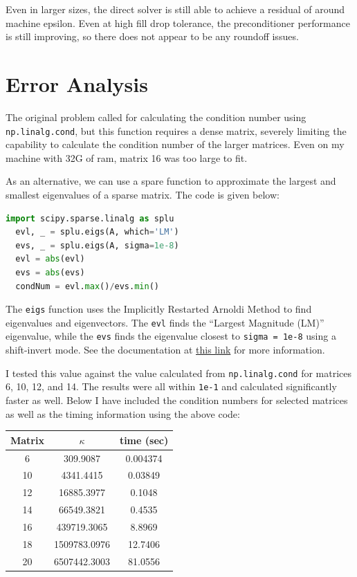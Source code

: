 \documentclass[oneside,final]{amsart}  %
\begin{document}
Even in larger sizes, the direct solver is still able to achieve a residual of around machine epsilon.
Even at high fill drop tolerance, the preconditioner performance is still improving, so there does
not appear to be any roundoff issues.

\section{Error Analysis}
The original problem called for calculating the condition number using \texttt{np.linalg.cond}, but
this function requires a dense matrix, severely limiting the capability to calculate the condition
number of the larger matrices.
Even on my machine with 32G of ram, matrix 16 was too large to fit.

As an alternative, we can use a spare function to approximate the largest and smallest eigenvalues
of a sparse matrix.  The code is given below:
\begin{lstlisting}[language=Python]
  import scipy.sparse.linalg as splu
  evl, _ = splu.eigs(A, which='LM')
  evs, _ = splu.eigs(A, sigma=1e-8)
  evl = abs(evl)
  evs = abs(evs)
  condNum = evl.max()/evs.min()
\end{lstlisting}
The \texttt{eigs} function uses the Implicitly Restarted Arnoldi Method to find eigenvalues and eigenvectors.
The \texttt{evl} finds the ``Largest Magnitude (LM)'' eigenvalue, while the \texttt{evs} finds the
eigenvalue closest to \texttt{sigma = 1e-8} using a shift-invert mode.  See the documentation at
\href{https://docs.scipy.org/doc/scipy/reference/generated/scipy.sparse.linalg.eigs.html}{this link} for more
information.

I tested this value against the value calculated from \texttt{np.linalg.cond} for matrices 6, 10,
12, and 14. The results were all within \texttt{1e-1} and calculated significantly faster as
well. Below I have included the condition numbers for selected matrices as well as the timing
information using the above code:
\begin{center}
\begin{tabular}{|c|c|c|}
  \hline
  Matrix & $\kappa$ & time (sec) \\
  \hline
  6 &      309.9087 & 0.004374 \\
  10 &    4341.4415 & 0.03849 \\
  12 &   16885.3977 & 0.1048 \\
  14 &   66549.3821 & 0.4535 \\
  16 &  439719.3065 & 8.8969 \\
  18 & 1509783.0976 & 12.7406 \\
  20 & 6507442.3003 & 81.0556 \\
  \hline
\end{tabular}
\end{center}
\end{document}
